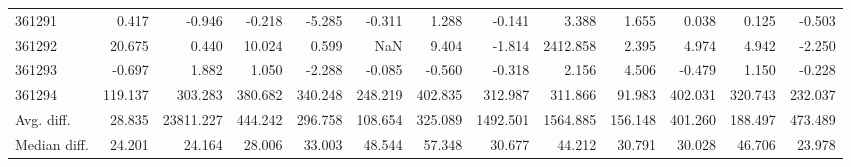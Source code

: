 \begin{tabular}{lrrrrrrrrrrrr}
361291 & 0.417 & -0.946 & -0.218 & -5.285 & -0.311 & 1.288 & -0.141 & 3.388 & 1.655 & 0.038 & 0.125 & -0.503 \\
361292 & 20.675 & 0.440 & 10.024 & 0.599 & NaN & 9.404 & -1.814 & 2412.858 & 2.395 & 4.974 & 4.942 & -2.250 \\
361293 & -0.697 & 1.882 & 1.050 & -2.288 & -0.085 & -0.560 & -0.318 & 2.156 & 4.506 & -0.479 & 1.150 & -0.228 \\
361294 & 119.137 & 303.283 & 380.682 & 340.248 & 248.219 & 402.835 & 312.987 & 311.866 & 91.983 & 402.031 & 320.743 & 232.037 \\
Avg. diff. & 28.835 & 23811.227 & 444.242 & 296.758 & 108.654 & 325.089 & 1492.501 & 1564.885 & 156.148 & 401.260 & 188.497 & 473.489 \\
Median diff. & 24.201 & 24.164 & 28.006 & 33.003 & 48.544 & 57.348 & 30.677 & 44.212 & 30.791 & 30.028 & 46.706 & 23.978 \\
\bottomrule
\end{tabular}
